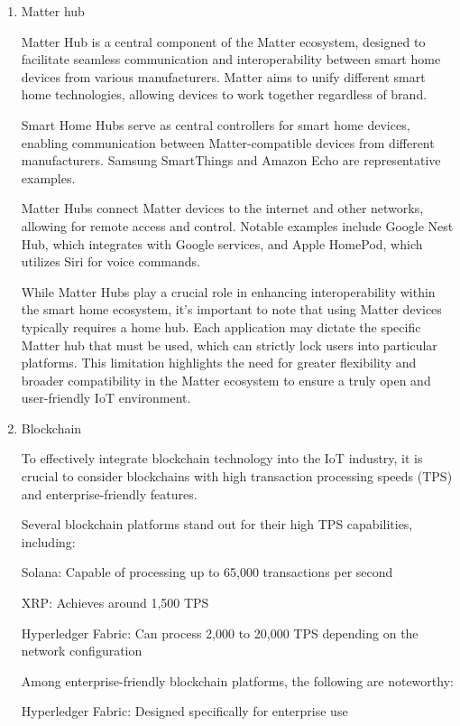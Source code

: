 \documentclass[conference]{IEEEtran}
\begin{document}
\begin{enumerate}[itemsep=2ex, parsep=1ex]
	\item Matter hub
	          
	      Matter Hub is a central component of the Matter ecosystem, designed to facilitate seamless communication and interoperability between smart home devices from various manufacturers. Matter aims to unify different smart home technologies, allowing devices to work together regardless of brand.
	          
	      Smart Home Hubs serve as central controllers for smart home devices, enabling communication between Matter-compatible devices from different manufacturers. Samsung SmartThings and Amazon Echo are representative examples.
	          
	      Matter Hubs connect Matter devices to the internet and other networks, allowing for remote access and control. Notable examples include Google Nest Hub, which integrates with Google services, and Apple HomePod, which utilizes Siri for voice commands.
	          
	      While Matter Hubs play a crucial role in enhancing interoperability within the smart home ecosystem, it's important to note that using Matter devices typically requires a home hub. Each application may dictate the specific Matter hub that must be used, which can strictly lock users into particular platforms. This limitation highlights the need for greater flexibility and broader compatibility in the Matter ecosystem to ensure a truly open and user-friendly IoT environment.
	      
	\item Blockchain
	          
	      To effectively integrate blockchain technology into the IoT industry, it is crucial to consider blockchains with high transaction processing speeds (TPS) and enterprise-friendly features. 
	          
	      Several blockchain platforms stand out for their high TPS capabilities, including:
	          
	      Solana: Capable of processing up to 65,000 transactions per second
	       
	      XRP: Achieves around 1,500 TPS
	       
	      Hyperledger Fabric: Can process 2,000 to 20,000 TPS depending on the network configuration
	       
	      Among enterprise-friendly blockchain platforms, the following are noteworthy:
	          
	      Hyperledger Fabric: Designed specifically for enterprise use
	           

\end{enumerate}
\end{document}
